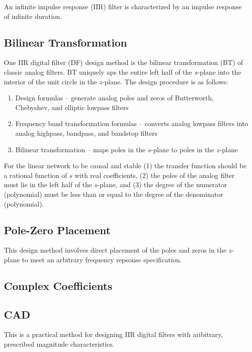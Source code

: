 \documentclass[11pt]{book}
\theoremstyle{example}
\begin{document}
An infinite impulse response (IIR) filter is characterized by an impulse response of infinite duration.

\subsection{Bilinear Transformation}

One IIR digital filter (DF) design method is the bilinear transformation (BT) of classic analog filters. BT uniquely aps the entire left half of the $s$-plane into the interior of the unit circle in the $z$-plane. The design procedure is as follows:
\begin{enumerate}
	\item Design formulas -- generate analog poles and zeros of Butterworth, Chebyshev, and elliptic lowpass filters
	\item Frequency band transformation formulas -- converts analog lowpass filters into analog highpass, bandpass, and bandstop filters
	\item Bilinear transformation -- maps poles in the $s$-plane to poles in the $z$-plane
\end{enumerate}

For the linear network to be causal and stable (1) the transfer function should be a rational function of $s$ with real coefficients, (2) the poles of the analog filter must lie in the left half of the $s$-plane, and (3) the degree of the numerator (polynomial) must be less than or equal to the degree of the denominator (polynomial).

\subsection{Pole-Zero Placement}

This design method involves direct placement of the poles and zeros in the $z$-plane to meet an arbitrary frequency repsonse specification.

\subsection{Complex Coefficients}

\subsection{CAD}

This is a practical method for designing IIR digital filters with aribitrary, prescribed magnitude characteristics.
\end{document}
